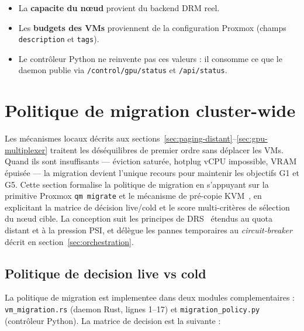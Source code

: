 \begin{itemize}
    \item La \textbf{capacite du n\oe{}ud} provient du backend DRM reel.
    \item Les \textbf{budgets des VMs} proviennent de la configuration Proxmox (champs \texttt{description} et \texttt{tags}).
    \item Le contr\^oleur Python ne reinvente pas ces valeurs : il consomme ce que le daemon publie via \texttt{/control/gpu/status} et \texttt{/api/status}.
\end{itemize}

\section{Politique de migration cluster-wide}
\label{sec:migration}

Les mécanismes locaux décrits aux sections~\ref{sec:paging-distant}--\ref{sec:gpu-multiplexer} traitent les déséquilibres de premier ordre sans déplacer les VMs. Quand ils sont insuffisants --- éviction saturée, hotplug vCPU impossible, VRAM épuisée --- la migration devient l'unique recours pour maintenir les objectifs G1 et G5. Cette section formalise la politique de migration en s'appuyant sur la primitive Proxmox \texttt{qm migrate} et le mécanisme de pré-copie KVM~\cite{clark_2005}, en explicitant la matrice de décision live/cold et le score multi-critères de sélection du nœud cible. La conception suit les principes de DRS~\cite{gulati_2012_drs} étendus au quota distant et à la pression PSI, et délègue les pannes temporaires au \textit{circuit-breaker} décrit en section~\ref{sec:orchestration}.

\subsection{Politique de decision live vs cold}
\label{subsec:live-vs-cold}

La politique de migration est implementee dans deux modules complementaires : \texttt{vm\_migration.rs} (daemon Rust, lignes 1--17) et \texttt{migration\_policy.py} (contr\^oleur Python). La matrice de decision est la suivante :

